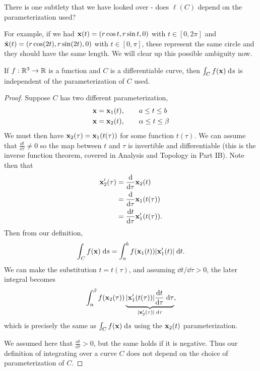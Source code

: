 \documentclass[a4paper]{scrreprt}
\begin{document}
There is one subtlety that we have looked over - does $\ell(C)$ depend on the parameterization used?

For example, if we had $\mathbf{x}(t) = (r \cos t, r \sin t, 0)$ with $t \in [0, 2 \pi]$ and $\tilde{\mathbf{x}}(t) = (r \cos(2 t), r \sin(2 t), 0)$ with $t \in [0, \pi]$, these represent the same circle and they should have the same length. We will clear up this possible ambiguity now.

\begin{proposition}
	If $f:\mathbb{R}^3 \rightarrow \mathbb{R}$ is a function and $C$ is a differentiable curve, then $\int_C f(\mathbf{x}) \; \mathrm{d} s$ is independent of the parameterization of $C$ used.
\end{proposition}
\begin{proof}
Suppose $C$ has two different parameterization,
\begin{align*}
	\mathbf{x} &= \mathbf{x}_1(t), \quad \quad a \leq t \leq b \\
	\mathbf{x} &= \mathbf{x}_2(t), \quad \quad \alpha \leq t \leq \beta
\end{align*}
We must then have $\mathbf{x}_2(\tau) = \mathbf{x}_1(t(\tau))$ for some function $t(\tau)$. We can assume that $\frac{\dd t}{\dd \tau} \neq 0$ so the map between $t$ and $\tau$ is invertible and differentiable (this is the inverse function theorem, covered in Analysis and Topology in Part IB). Note then that 
\begin{align*}
	\mathbf{x}'_2(\tau) &= \frac{\mathrm{d}}{\mathrm{d}\tau} \mathbf{x}_2(t) \\
	&= \frac{\mathrm{d}} {\mathrm{d} \tau} \mathbf{x}_1(t(\tau)) \\
	&= \frac{\mathrm{d} t}{\mathrm{d} \tau} \mathbf{x}_1'(t(\tau)).
\end{align*}
Then from our definition,
$$
\int_C f(\mathbf{x}) \; \mathrm{d} s = \int_{a}^b f(\mathbf{x}_1(t)) |\mathbf{x}_1'(t)| \; \mathrm{d} t.
$$
We can make the substitution $t = t(\tau)$, and assuming $\dd t/\dd\tau > 0$, the later integral becomes
$$
\int_\alpha^\beta f(\mathbf{x}_2(\tau)) \underbrace{|\mathbf{x}_1'(t(\tau))| \frac{\mathrm{d} t}{\mathrm{d} \tau} \;\mathrm{d} \tau}_{|\mathbf{x}'_2 (\tau)| \; \mathrm{d}\tau},
$$
which is precisely the same as $\int_C f(\mathbf{x}) \; \mathrm{d} s$ using the $\mathbf{x}_2(t)$ parameterization. 

We assumed here that $\frac{\dd t}{\dd \tau} > 0$, but the same holds if it is negative. Thus our definition of integrating over a curve $C$ does not depend on the choice of parameterization of $C$.
\end{proof}
\end{document}
